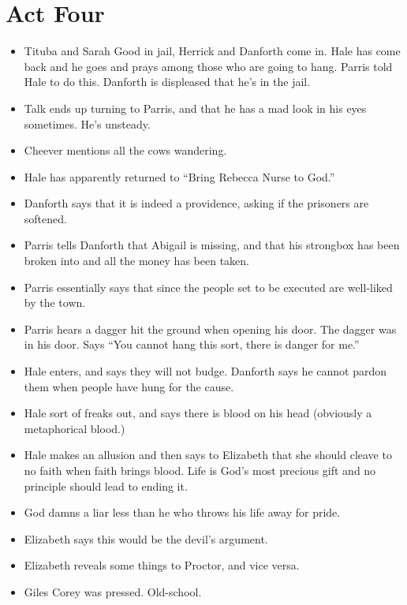 \documentclass[10pt]{article}
\begin{document}
\section{Act Four}
\begin{itemize}
	\item Tituba and Sarah Good in jail, Herrick and Danforth come in.  Hale has 
		come back and he goes and prays among those who are going to hang.  Parris
		told Hale to do this.  Danforth is displeased that he's in the jail.
	\item Talk ends up turning to Parris, and that he has a mad look in his eyes
		sometimes.  He's unsteady.
	\item Cheever mentions all the cows wandering.
	\item Hale has apparently returned to ``Bring Rebecca Nurse to God.''
	\item Danforth says that it is indeed a providence, asking if the prisoners
		are softened.
	\item Parris tells Danforth that Abigail is missing, and that his strongbox
		has been broken into and all the money has been taken.
	\item Parris essentially says that since the people set to be executed are
		well-liked by the town.
	\item Parris hears a dagger hit the ground when opening his door.  The dagger
		was in his door.  Says ``You cannot hang this sort, there is danger for
		me.''
	\item Hale enters, and says they will not budge.  Danforth says he cannot
		pardon them when people have hung for the cause.
	\item Hale sort of freaks out, and says there is blood on his head (obviously
		a metaphorical blood.)
	\item Hale makes an allusion and then says to Elizabeth that she should cleave
		to no faith when faith brings blood.  Life is God's most precious gift and
		no principle should lead to ending it.  
	\item God damns a liar less than he who throws his life away for pride.  
	\item Elizabeth says this would be the devil's argument.
	\item Elizabeth reveals some things to Proctor, and vice versa.
	\item Giles Corey was pressed.  Old-school.
\end{itemize}
\end{document}
